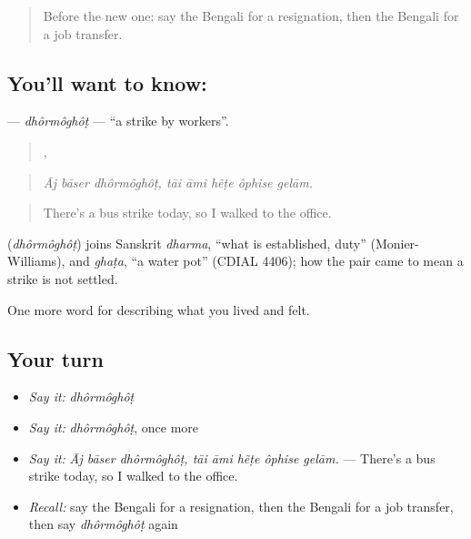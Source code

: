 \label{lesson:BN-C497-dhormoghot}



\begin{quote}
Before the new one: say the Bengali for a resignation, then the Bengali for a job transfer.
\end{quote}

\subsection*{You'll want to know: }
\textbf{} — \emph{dhôrmôghôṭ} — \textquotedblleft{}a strike by workers\textquotedblright{}.

\begin{quote}
  ,     
\end{quote}

\begin{quote}
\emph{Āj bāser dhôrmôghôṭ, tāi āmi hẽṭe ôphise gelām.}
\end{quote}

\begin{quote}
There's a bus strike today, so I walked to the office.
\end{quote}

\begin{cousinweb}
\textbf{} (\emph{dhôrmôghôṭ}) joins Sanskrit \emph{dharma}, \textquotedblleft{}what is established, duty\textquotedblright{} (Monier-Williams), and \emph{ghaṭa}, \textquotedblleft{}a water pot\textquotedblright{} (CDIAL 4406); how the pair came to mean a strike is not settled.
\end{cousinweb}

\begin{grammarlens}[title={What you've built}]
One more word for describing what you lived and felt.
\end{grammarlens}

\subsection*{Your turn}
\begin{itemize}
\raggedright
  \item \emph{Say it:} \emph{dhôrmôghôṭ}
  \item \emph{Say it:} \emph{dhôrmôghôṭ}, once more
  \item \emph{Say it:} \emph{Āj bāser dhôrmôghôṭ, tāi āmi hẽṭe ôphise gelām.} — There's a bus strike today, so I walked to the office.
  \item \emph{Recall:} say the Bengali for a resignation, then the Bengali for a job transfer, then say \emph{dhôrmôghôṭ} again
\end{itemize}

